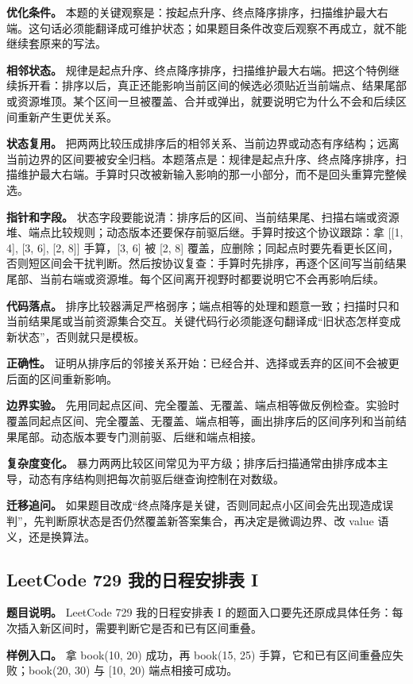 \textbf{优化条件。} 本题的关键观察是：按起点升序、终点降序排序，扫描维护最大右端。这句话必须能翻译成可维护状态；如果题目条件改变后观察不再成立，就不能继续套原来的写法。

\textbf{相邻状态。} 规律是起点升序、终点降序排序，扫描维护最大右端。把这个特例继续拆开看：排序以后，真正还能影响当前区间的候选必须贴近当前端点、结果尾部或资源堆顶。某个区间一旦被覆盖、合并或弹出，就要说明它为什么不会和后续区间重新产生更优关系。

\textbf{状态复用。} 把两两比较压成排序后的相邻关系、当前边界或动态有序结构；远离当前边界的区间要被安全归档。本题落点是：规律是起点升序、终点降序排序，扫描维护最大右端。手算时只改被新输入影响的那一小部分，而不是回头重算完整候选。

\textbf{指针和字段。} 状态字段要能说清：排序后的区间、当前结果尾、扫描右端或资源堆、端点比较规则；动态版本还要保存前驱后继。手算时按这个协议跟踪：拿 [[1, 4], [3, 6], [2, 8]] 手算，[3, 6] 被 [2, 8] 覆盖，应删除；同起点时要先看更长区间，否则短区间会干扰判断。然后按协议复查：手算时先排序，再逐个区间写当前结果尾部、当前右端或资源堆。每个区间离开视野时都要说明它不会再影响后续。

\textbf{代码落点。} 排序比较器满足严格弱序；端点相等的处理和题意一致；扫描时只和当前结果尾或当前资源集合交互。关键代码行必须能逐句翻译成“旧状态怎样变成新状态”，否则就只是模板。

\textbf{正确性。} 证明从排序后的邻接关系开始：已经合并、选择或丢弃的区间不会被更后面的区间重新影响。

\textbf{边界实验。} 先用同起点区间、完全覆盖、无覆盖、端点相等做反例检查。实验时覆盖同起点区间、完全覆盖、无覆盖、端点相等，画出排序后的区间序列和当前结果尾部。动态版本要专门测前驱、后继和端点相接。

\textbf{复杂度变化。} 暴力两两比较区间常见为平方级；排序后扫描通常由排序成本主导，动态有序结构则把每次前驱后继查询控制在对数级。

\textbf{迁移追问。} 如果题目改成“终点降序是关键，否则同起点小区间会先出现造成误判”，先判断原状态是否仍然覆盖新答案集合，再决定是微调边界、改 value 语义，还是换算法。

\subsection{LeetCode 729 我的日程安排表 I}

\textbf{题目说明。} LeetCode 729 我的日程安排表 I 的题面入口要先还原成具体任务：每次插入新区间时，需要判断它是否和已有区间重叠。

\textbf{样例入口。} 拿 book(10, 20) 成功，再 book(15, 25) 手算，它和已有区间重叠应失败；book(20, 30) 与 [10, 20) 端点相接可成功。

